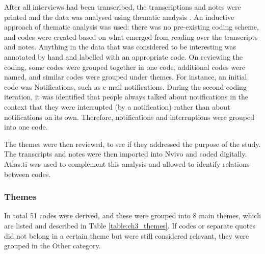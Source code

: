 After all interviews had been transcribed, the transcriptions and notes were printed and the data was analysed using thematic analysis \citep{Braun2006}. An inductive approach of thematic analysis was used: there was no pre-existing coding scheme, and codes were created based on what emerged from reading over the transcripts and notes. Anything in the data that was considered to be interesting was annotated by hand and labelled with an appropriate code. On reviewing the coding, some codes were grouped together in one code, additional codes were named, and similar codes were grouped under themes. For instance, an initial code was Notifications, such as e-mail notifications. During the second coding iteration, it was identified that people always talked about notifications in the context that they were interrupted (by a notification) rather than about notifications on its own. Therefore, notifications and interruptions were grouped into one code. 

The themes were then reviewed, to see if they addressed the purpose of the study. The transcripts and notes were then imported into Nvivo and coded digitally. Atlas.ti was used to complement this analysis and allowed to identify relations between codes. 

\subsubsection{Themes}
In total 51 codes were derived, and these were grouped into 8 main themes, which are listed and described in Table \ref{table:ch3_themes}. If codes or separate quotes did not belong in a certain theme but were still considered relevant, they were grouped in the Other category. 

